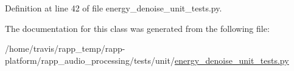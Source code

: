 Definition at line 42 of file energy\-\_\-denoise\-\_\-unit\-\_\-tests.\-py.



The documentation for this class was generated from the following file\-:\begin{DoxyCompactItemize}
\item 
/home/travis/rapp\-\_\-temp/rapp-\/platform/rapp\-\_\-audio\-\_\-processing/tests/unit/\hyperlink{energy__denoise__unit__tests_8py}{energy\-\_\-denoise\-\_\-unit\-\_\-tests.\-py}\end{DoxyCompactItemize}
